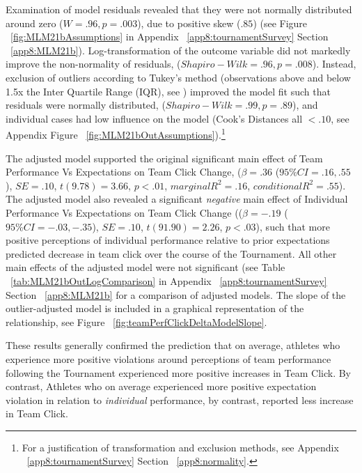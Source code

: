 \begin{CJK}{UTF8}{gbsn}
Examination of model residuals revealed that they were not normally distributed around zero ($W = .96, p = .003$), due to positive skew ($.85$) (see Figure ~\ref{fig:MLM21bAssumptions} in Appendix ~\ref{app8:tournamentSurvey} Section ~\ref{app8:MLM21b}). Log-transformation of the outcome variable did not markedly improve the non-normality of residuals, ($Shapiro-Wilk = .96, p = .008$).    Instead, exclusion of outliers according to Tukey's method (observations above and below 1.5x the Inter Quartile Range (IQR), see \citep{Tukey1977}) improved the model fit such that residuals were normally distributed, ($Shapiro-Wilk = .99, p = .89$), and individual cases had low influence on the model (Cook's Distances all $< .10$, see Appendix Figure ~\ref{fig:MLM21bOutAssumptions}).\footnote{For a justification of transformation and exclusion methods, see Appendix ~\ref{app8:tournamentSurvey} Section ~\ref{app8:normality}.}

The adjusted model supported the original significant main effect of Team Performance Vs Expectations on Team Click Change, ($\beta = .36$ ($95\% CI =  .16, .55$), $SE = .10$, $t(9.78) = 3.66$, $p < .01$, $marginal R^2 = .16$, $conditional R^2 = .55$). The adjusted model also revealed a significant \textit{negative} main effect of Individual Performance Vs Expectations on Team Click Change (($\beta = -.19$ ($95\% CI =  -.03, -.35$), $SE = .10$, $t(91.90) = 2.26$, $p < .03$), such that more positive perceptions of individual performance relative to prior expectations predicted decrease in team click over the course of the Tournament.  All other main effects of the adjusted model were not significant (see Table ~\ref{tab:MLM21bOutLogComparison}  in Appendix ~\ref{app8:tournamentSurvey} Section ~\ref{app8:MLM21b} for a comparison of adjusted models.  The slope of the outlier-adjusted model is included in a graphical representation of the relationship, see Figure ~\ref{fig:teamPerfClickDeltaModelSlope}.

These results generally confirmed the prediction that on average, athletes who experience more positive violations around perceptions of team performance following the Tournament experienced more positive increases in Team Click. By contrast, Athletes who on average experienced more positive expectation violation in relation to \textit{individual} performance, by contrast, reported less increase in Team Click.




\end{CJK}
